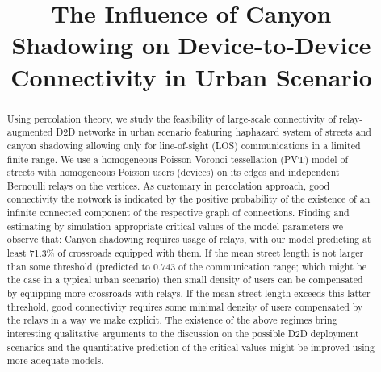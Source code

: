 \documentclass[conference]{IEEEtran}
\begin{document}
\title{The Influence of Canyon Shadowing on Device-to-Device
  Connectivity in Urban Scenario
}

\author{
}

\maketitle

\begin{abstract}
Using percolation theory, we study the  feasibility  of large-scale  connectivity  of  relay-augmented D2D  networks  in urban scenario featuring haphazard system of streets and  canyon shadowing allowing only for line-of-sight (LOS) communications in a limited  finite range.
We use a homogeneous  Poisson-Voronoi  tessellation (PVT) model of streets with   homogeneous Poisson users (devices)  on its edges 
and independent Bernoulli relays on the vertices. 
As customary in percolation approach, good connectivity the notwork   is  indicated by the positive probability of the  existence of an infinite connected component of the respective graph of connections. Finding and estimating by simulation appropriate critical values of the  model parameters we observe that: Canyon shadowing requires usage of relays, with our model predicting at  least 71.3\%  of  crossroads  equipped with them.  If the mean street length 
is not larger than  some threshold (predicted to 0.743 of the communication range; which might be  the case in a typical urban scenario) then small density  of  users  can  be  compensated by equipping more  crossroads  with relays.
If the mean street length exceeds this latter threshold,
good connectivity requires some minimal density of users compensated by the relays
in a way we make explicit. The existence of the above regimes bring interesting qualitative  arguments to the discussion on the  possible D2D deployment  scenarios
and the quantitative prediction of the  critical  values might be improved
using more adequate models.
\end{abstract}
\end{document}
